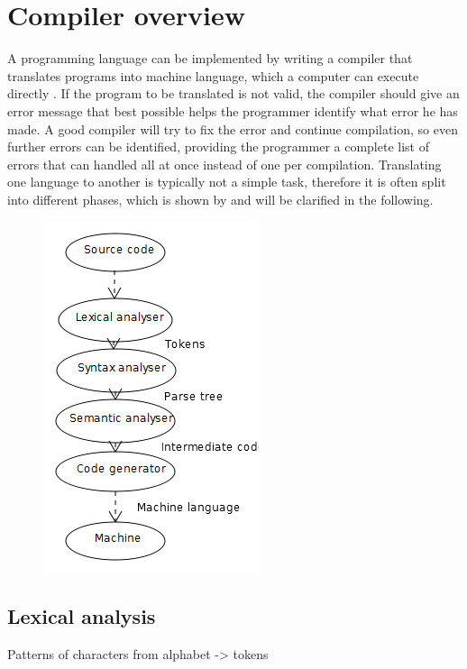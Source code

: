 \section{Compiler overview}

A programming language can be implemented by writing a compiler that translates programs into machine language, which a computer can execute directly \cite[p. 44]{sebesta2013}.
If the program to be translated is not valid, the compiler should give an error message that best possible helps the programmer identify what error he has made. A good compiler will try to fix the error and continue compilation, so even further errors can be identified, providing the programmer a complete list of errors that can handled all at once instead of one per compilation. Translating one language to another is typically not a simple task, therefore it is often split into different phases, which is shown by  and will be clarified in the following.

\begin{figure}
\centering
\includegraphics[scale=0.5]{pictures/compileroverview.png}
\label{fig:compileroverviewphases}
\end{figure}

\subsection{Lexical analysis}

Patterns of characters from alphabet -> tokens

